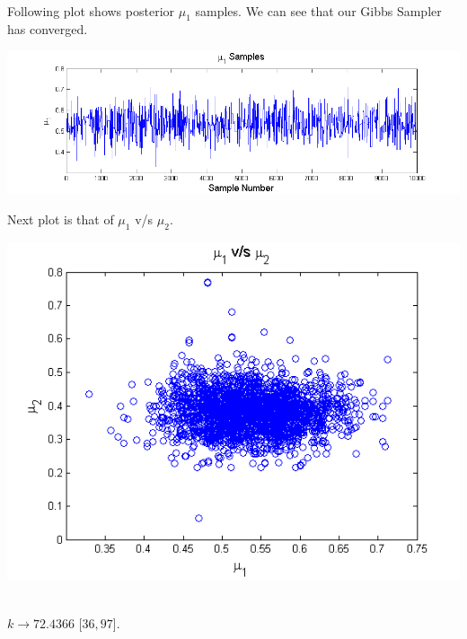 \documentclass{article}
\begin{document}
\pagebreak

\\

Following plot shows posterior $\mu_1$ samples. We can see that our Gibbs Sampler has converged.
\begin{center}
\includegraphics[scale=0.75]{Mu1Samples}\\
\end{center}

Next plot is that of $\mu_1$ v/s $\mu_2.$
\begin{center}
\includegraphics[scale=0.75]{Mu1vsMu2}\\
\end{center}

\\

$k \rightarrow 72.4366$ [$36 ,97$].\\

\\
\end{document}
